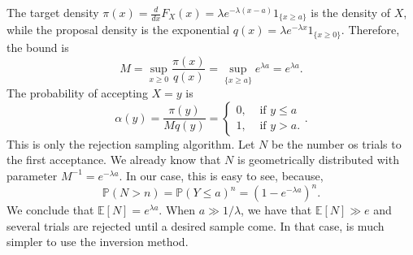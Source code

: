 \documentclass[a4paper,12pt]{article}
\newcommand{\ev}{\mathbb{E}}
\newcommand{\pr}{\mathbb{P}}
\theoremstyle{definition}
\begin{document}
\begin{enumerate}
    The target density $\pi(x) = \frac{d}{dx}F_X(x) = \lambda
    e^{-\lambda(x-a)}1_{\{x \ge a\}}$ is the density of $X$, while the proposal density
    is the exponential $q(x) = \lambda e^{-\lambda x}1_{\{x \ge 0\}}$. Therefore, the bound
    is 
    $$
    M = \sup_{x \ge 0} \frac{\pi(x)}{q(x)} = \sup_{\{x \ge a\}} e^{\lambda a} = e^{\lambda a}. 
    $$
    The probability of accepting $X = y$ is 
    $$
    \alpha(y) = \frac{\pi(y)}{Mq(y)} = \begin{cases}
        0, &\text{ if } y \le a \\
        1, &\text{ if } y > a.
    \end{cases}.
    $$
    This is only the rejection sampling algorithm. Let $N$ be the number os
    trials to the first acceptance.  We already know that $N$ is geometrically
    distributed with parameter $M^{-1} = e^{-\lambda a}$. In our case, this is
    easy to see, because, 
    $$
    \pr(N > n) = \pr(Y \le a)^n = (1 - e^{-\lambda a})^n.
    $$
    We conclude that $\ev[N] = e^{\lambda a}$. When $a \gg 1/\lambda$, we have
    that $\ev[N] \gg e$ and several trials are rejected until a desired
    sample come. In that case, is much simpler to use the inversion method.  
\end{enumerate}

% 
% 
\end{document}
